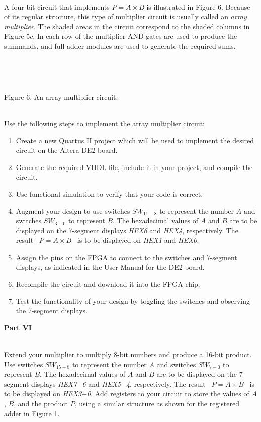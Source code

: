 \documentclass[psfig,10pt,fullpage]{article}
\begin{document}
~\\
A four-bit circuit that implements $P = A \times B$ is illustrated in Figure 6. Because of its
regular structure, this type of multiplier circuit is usually called an {\it array
multiplier}. The shaded areas in the circuit correspond to the shaded columns in Figure
5$c$. In each row of the multiplier AND gates are used to produce the summands,
and full adder modules are used to generate the required sums.

~\\
\begin{figure}[H]
\scriptsize
\centerline{
\hbox{}}
\end{figure}
~\\
\centerline{Figure 6.  An array multiplier circuit.}
~\\

Use the following steps to implement the array multiplier circuit:

\begin{enumerate}
\item Create a new Quartus II project which will be used to implement the desired
circuit on the Altera DE2 board.
\item Generate the required VHDL file, include it in your project, 
and compile the circuit.
\item Use functional simulation to verify that your code is correct.
\item Augment your design to use switches $SW_{11-8}$ to represent the 
number $A$ and switches $SW_{3-0}$ to represent $B$. The hexadecimal values of $A$ 
and $B$ are to be displayed on the 7-segment displays {\it HEX6} and {\it HEX4}, respectively.
The result ~$P = A \times B$~ is to be displayed on {\it HEX1} and {\it HEX0}.
\item Assign the pins on the FPGA to connect to the switches and 7-segment displays,
as indicated in the User Manual for the DE2 board.
\item Recompile the circuit and download it into the FPGA chip.
\item Test the functionality of your design by toggling the switches
and observing the 7-segment displays.
\end{enumerate}

\pagebreak
\noindent
{\bf Part VI}

~\\
\noindent
Extend your multiplier to multiply 8-bit numbers and produce a 16-bit product. 
Use switches $SW_{15-8}$ to represent the number $A$ and switches $SW_{7-0}$ to 
represent $B$. The hexadecimal values of $A$ and $B$ are to be displayed on the 
7-segment displays {\it HEX7$-$6} and {\it HEX5$-$4}, respectively.
The result ~$P = A \times B$~ is to be displayed on {\it HEX3$-$0}.
Add registers to your circuit to store the values of $A$, $B$, and the product $P$, using
a similar structure as shown for the registered adder in Figure 1.
\end{document}
